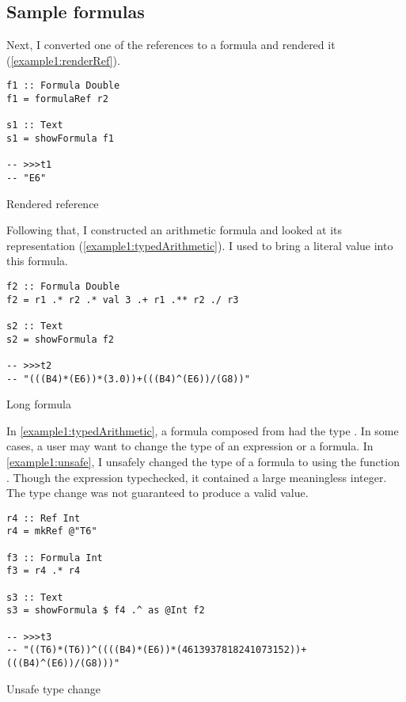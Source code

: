 \subsection{Sample formulas}
Next, I converted one of the references to a formula and rendered it (\cref{example1:renderRef}).

\begin{listing}[!h]
  \begin{verbatim}
f1 :: Formula Double
f1 = formulaRef r2

s1 :: Text
s1 = showFormula f1

-- >>>t1
-- "E6"
\end{verbatim}
  \caption{Rendered reference}
  \label{example1:renderRef}
\end{listing}

Following that, I constructed an arithmetic formula and looked at its representation (\cref{example1:typedArithmetic}). I used  to bring a literal value into this formula.

\begin{listing}[!h]
  \begin{verbatim}
f2 :: Formula Double
f2 = r1 .* r2 .* val 3 .+ r1 .** r2 ./ r3

s2 :: Text
s2 = showFormula f2

-- >>>t2
-- "(((B4)*(E6))*(3.0))+(((B4)^(E6))/(G8))"
\end{verbatim}
  \caption{Long formula}
  \label{example1:typedArithmetic}
\end{listing}

\newpage

In \cref{example1:typedArithmetic}, a formula  composed from  had the type . In some cases, a user may want to change the type of an expression or a formula. In \cref{example1:unsafe}, I unsafely changed the type of a formula  to  using the function . Though the expression typechecked, it contained a large meaningless integer. The type change was not guaranteed to produce a valid value.

\begin{listing}[!h]
  \begin{verbatim}
r4 :: Ref Int
r4 = mkRef @"T6"

f3 :: Formula Int
f3 = r4 .* r4

s3 :: Text
s3 = showFormula $ f4 .^ as @Int f2

-- >>>t3
-- "((T6)*(T6))^((((B4)*(E6))*(4613937818241073152))+(((B4)^(E6))/(G8)))"
\end{verbatim}
  \caption{Unsafe type change}
  \label{example1:unsafe}
\end{listing}

